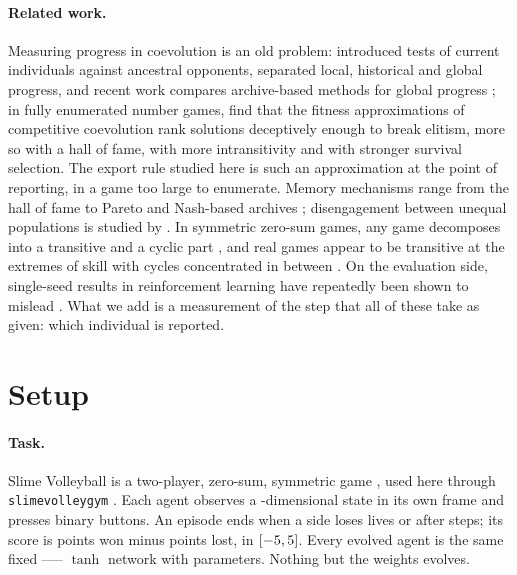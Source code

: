 \documentclass[11pt]{article}
\begin{document}
\paragraph{Related work.}
Measuring progress in coevolution is an old problem: \citet{cliff1995tracking}
introduced tests of current individuals against ancestral opponents,
\citet{miconi2009why} separated local, historical and global progress, and
recent work compares archive-based methods for global progress
\citep{simione2020longterm,nolfi2025global}; in fully enumerated number
games, \citet{seals2026tripping} find that the fitness approximations of
competitive coevolution rank solutions deceptively enough to break elitism,
more so with a hall of fame, with more intransitivity and with stronger
survival selection. The export rule studied here is such an approximation at
the point of reporting, in a game too large to enumerate. Memory
mechanisms range from the hall of fame \citep{rosin1997new} to Pareto and
Nash-based archives \citep{ficici2001pareto,ficici2003memory}; disengagement
between unequal populations is studied by \citet{cartlidge2004combating}. In
symmetric zero-sum games, any game decomposes into a transitive and a cyclic
part \citep{balduzzi2019openended}, and real games appear to be transitive at
the extremes of skill with cycles concentrated in between
\citep{czarnecki2020spinning}. On the evaluation side, single-seed results in
reinforcement learning have repeatedly been shown to mislead
\citep{henderson2018matters,agarwal2021precipice}. What we add is a measurement
of the step that all of these take as given: which individual is reported.

\section{Setup}
\label{sec:setup}

\paragraph{Task.}
Slime Volleyball is a two-player, zero-sum, symmetric game
\citep{ha2015slime}, used here through \texttt{slimevolleygym}
\citep{ha2020slimevolleygym}. Each agent observes a \nObsSize-dimensional state in its
own frame and presses \nNAct{} binary buttons. An episode ends when a side loses
\nLives{} lives or after \nTLimit{} steps; its score is points won minus points
lost, in $[-5,5]$. Every evolved agent is the same fixed
\nObsSize--\nHidden--\nHidden--\nNAct{} $\tanh$ network with \nParamCount{}
parameters. Nothing but the weights evolves.
\end{document}
